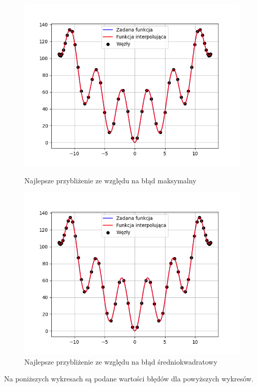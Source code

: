 \documentclass{article}
\begin{document}
\begin{figure}[H]
  \begin{minipage}[b]{0.49\textwidth}
    \includegraphics[width=\textwidth]{img05.png}
    \caption{Najlepsze przybliżenie ze względu na błąd maksymalny}
  \end{minipage}
  \hfill
  \begin{minipage}[b]{0.49\textwidth}
    \includegraphics[width=\textwidth]{img06.png}
    \caption{Najlepsze przybliżenie ze względu na błąd średniokwadratowy}
  \end{minipage}
\end{figure}

Na poniższych wykresach są podane wartości błędów dla powyższych wykresów.
\end{document}
